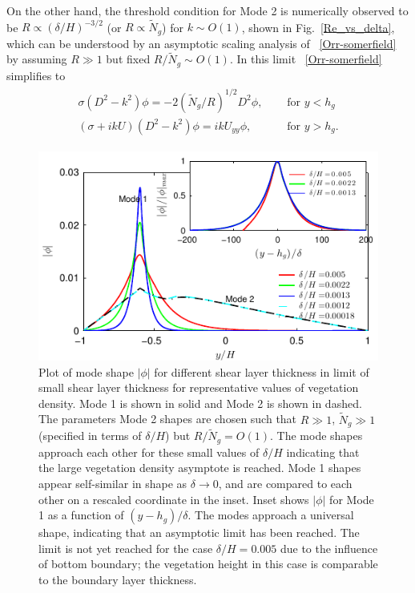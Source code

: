 \documentclass[aps,prl,twocolumn,superscriptaddress,sort&compress,10pt]{revtex4-1}  %
\newcommand{\hg}{h_g}
\newcommand{\Rey}{{R}}
\newcommand{\Ndg}{\tilde{N}_g}
\begin{document}
On the other hand, the threshold condition for Mode 2 is numerically observed to be $\Rey \propto ({\delta}/{H})^{-3/2}$ (or $\Rey \propto \Ndg$) for $k\sim O(1)$, shown in Fig.~\ref{Re_vs_delta}, which can be understood by an asymptotic scaling analysis of ~\eqref{Orr-somerfield} by assuming $\Rey \gg 1$ but fixed $\Rey/\Ndg \sim O(1)$.
In this limit ~\eqref{Orr-somerfield} simplifies to 
\begin{align}
\begin{split}
\sigma\left(D^2-k^2\right)\phi = -2{(\Ndg/\Rey)^{1/2}}D^2\phi,  \quad &\text{ for $y<\hg$}  \\
\left(\sigma+ikU\right) \left(D^2-k^2\right)\phi =  ikU_{yy}\phi, \quad &\text{ for $y>\hg$}.
\end{split}
\label{eqn:mode2asymp}
\end{align}
\begin{figure}
\includegraphics[]{Asymptotic_noshear}
\caption{Plot of mode shape $|\phi|$ for different shear layer thickness in limit of small shear layer thickness for representative values of vegetation density. 
Mode 1 is shown in solid and Mode 2 is shown in dashed. The parameters Mode 2 shapes are chosen such that $\Rey \gg 1$, $\Ndg \gg 1$ (specified in terms of $\delta/H$) but $\Rey/\Ndg = O(1)$. 
The mode shapes approach each other for these small values of $\delta/H$ indicating that the large vegetation density asymptote is reached. Mode 1 shapes appear self-similar in shape as $\delta\to 0$, 
and are compared to each other on a rescaled coordinate in the inset. 
Inset shows $|\phi|$ for Mode 1 as a function of $(y-\hg)/\delta$. The modes approach a universal shape, indicating that an asymptotic limit has been reached. 
The limit is not yet reached for the case $\delta/H = 0.005$ due to the influence of bottom boundary; the vegetation height in this case is comparable to the boundary layer thickness.}
\label{Asymptotic_mode}
\end{figure}
\end{document}
